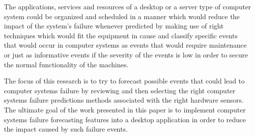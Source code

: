 The applications, services and resources of a desktop or a server type of computer system could be organized
and scheduled in a manner which would reduce the impact of the system’s failure whenever predicted by
making use of right techniques which would fit the equipment in cause and classify specific events that would
occur in computer systems as events that would require maintenance or just as informative events if the severity
of the events is low in order to secure the normal functionality of the machines. \par
\newline
The focus of this research is to try to forecast possible events that could lead to computer systems failure by
reviewing and then selecting the right computer systems failure predictions methods associated with the right
hardware sensors. The ultimate goal of the work presented in this paper is to implement computer systems failure
forecasting features into a desktop application in order to reduce the impact caused by such failure events.